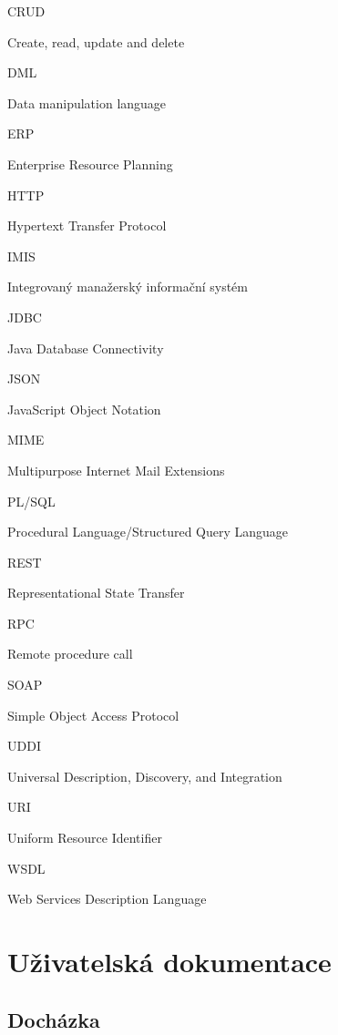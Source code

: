 \documentclass{diplomka}
\begin{document}
\begin{list}{}{\setlength{\leftmargin}{30mm}
\setlength{\labelwidth}{30mm} \setlength{\labelsep}{0mm} }
\item[\parbox{30mm}{CRUD}] Create, read, update and delete
\item[\parbox{30mm}{DML}] Data manipulation language
\item[\parbox{30mm}{ERP}] Enterprise Resource Planning 
\item[\parbox{30mm}{HTTP}] Hypertext Transfer Protocol
\item[\parbox{30mm}{IMIS}] Integrovaný manažerský informační systém
\item[\parbox{30mm}{JDBC}] Java Database Connectivity
\item[\parbox{30mm}{JSON}] JavaScript Object Notation
\item[\parbox{30mm}{MIME}] Multipurpose Internet Mail Extensions
\item[\parbox{30mm}{PL/SQL}] Procedural Language/Structured Query Language
\item[\parbox{30mm}{REST}] Representational State Transfer
\item[\parbox{30mm}{RPC}] Remote procedure call
\item[\parbox{30mm}{SOAP}] Simple Object Access Protocol
\item[\parbox{30mm}{UDDI}] Universal Description, Discovery, and Integration
\item[\parbox{30mm}{URI}] Uniform Resource Identifier
\item[\parbox{30mm}{WSDL}] Web Services Description Language
\end{list}

\appendix



\pagestyle{fancy}

\chapter{Uživatelská dokumentace}
\section{Docházka}
\end{document}
